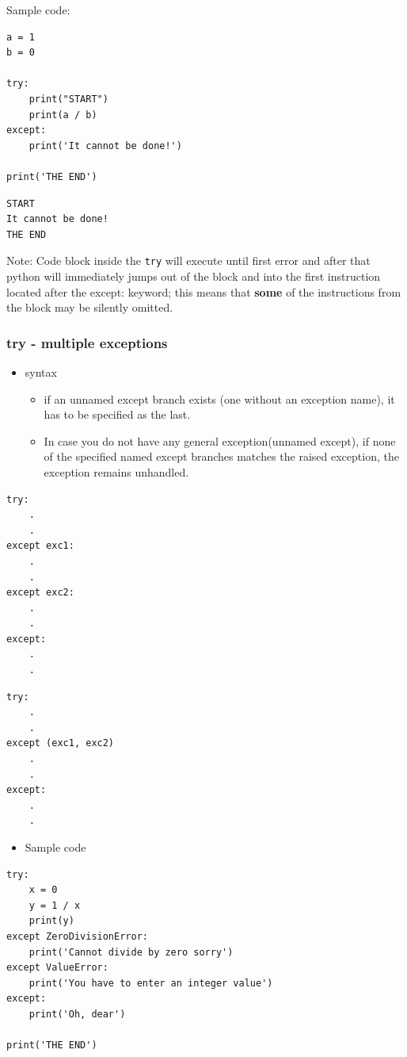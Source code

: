 \documentclass[11pt]{article}
\begin{document}
Sample code:
\begin{verbatim}
a = 1
b = 0

try:
    print("START")
    print(a / b)
except:
    print('It cannot be done!')

print('THE END')

\end{verbatim}

\begin{verbatim}
START
It cannot be done!
THE END
\end{verbatim}

Note: Code block inside the \texttt{try} will execute until first error and
after that python will immediately jumps out of the block and into the
first instruction located after the except: keyword; this means that
\textbf{some} of the instructions from the block may be silently omitted.

\subsubsection{try - multiple exceptions}
\label{sec:org4c375de}
\begin{itemize}
\item syntax
\begin{itemize}
\item if an unnamed except branch exists (one without an exception
name), it has to be specified as the last.
\item In case you do not have any general exception(unnamed except), if
none of the specified named except branches matches the raised
exception, the exception remains unhandled.
\end{itemize}
\end{itemize}

\begin{verbatim}
try:
    .
    .
except exc1:
    .
    .
except exc2:
    .
    .
except:
    .
    .
\end{verbatim}

\begin{verbatim}
try:
    .
    .
except (exc1, exc2)
    .
    .
except:
    .
    .
\end{verbatim}

\begin{itemize}
\item Sample code
\end{itemize}
\begin{verbatim}
try:
    x = 0
    y = 1 / x
    print(y)
except ZeroDivisionError:
    print('Cannot divide by zero sorry')
except ValueError:
    print('You have to enter an integer value')
except:
    print('Oh, dear')

print('THE END')
\end{verbatim}
\end{document}
